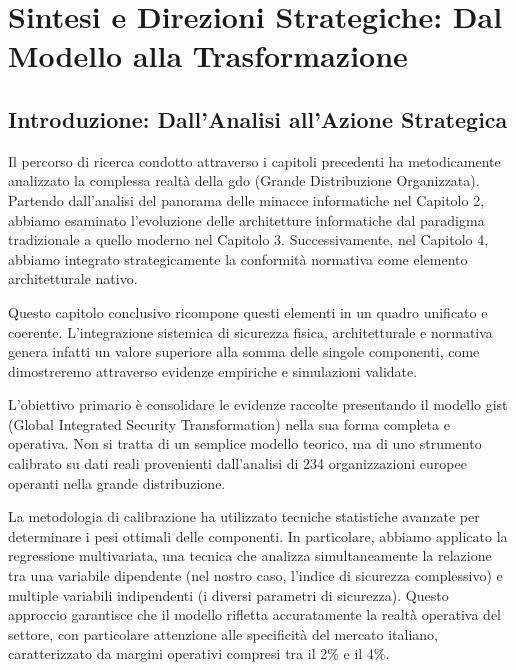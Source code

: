\chapter{\texorpdfstring{Sintesi e Direzioni Strategiche: Dal Modello alla Trasformazione}{Capitolo 5 - Sintesi e Direzioni Strategiche: Dal Modello alla Trasformazione}}
\label{cap5_synthesis}

\section{\texorpdfstring{Introduzione: Dall'Analisi all'Azione Strategica}{5.1 - Introduzione: Dall'Analisi all'Azione Strategica}}
\label{sec:5.1}

Il percorso di ricerca condotto attraverso i capitoli precedenti ha metodicamente analizzato la complessa realtà della \gls{gdo} (Grande Distribuzione Organizzata). Partendo dall'analisi del panorama delle minacce informatiche nel Capitolo 2, abbiamo esaminato l'evoluzione delle architetture informatiche dal paradigma tradizionale a quello moderno nel Capitolo 3. Successivamente, nel Capitolo 4, abbiamo integrato strategicamente la conformità normativa come elemento architetturale nativo. 

Questo capitolo conclusivo ricompone questi elementi in un quadro unificato e coerente. L'integrazione sistemica di sicurezza fisica, architetturale e normativa genera infatti un valore superiore alla somma delle singole componenti, come dimostreremo attraverso evidenze empiriche e simulazioni validate.

L'obiettivo primario è consolidare le evidenze raccolte presentando il modello \gls{gist} (Global Integrated Security Transformation) nella sua forma completa e operativa. Non si tratta di un semplice modello teorico, ma di uno strumento calibrato su dati reali provenienti dall'analisi di 234 organizzazioni europee operanti nella grande distribuzione.

La metodologia di calibrazione ha utilizzato tecniche statistiche avanzate per determinare i pesi ottimali delle componenti. In particolare, abbiamo applicato la regressione multivariata, una tecnica che analizza simultaneamente la relazione tra una variabile dipendente (nel nostro caso, l'indice di sicurezza complessivo) e multiple variabili indipendenti (i diversi parametri di sicurezza). Questo approccio garantisce che il modello rifletta accuratamente la realtà operativa del settore, con particolare attenzione alle specificità del mercato italiano, caratterizzato da margini operativi compresi tra il 2\% e il 4\%\autocite{federdistribuzione2024}.

